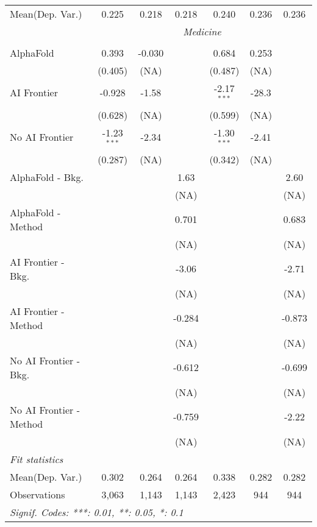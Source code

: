 \begin{tabular}{lcccccc}
Mean(Dep. Var.) & 0.225 & 0.218 & 0.218 & 0.240 & 0.236 & 0.236 \\
 & \multicolumn{6}{c}{\textit{Medicine}} \\ \\
   AlphaFold               & 0.393         & -0.030 &        & 0.684         & 0.253 &   \\   
                           & (0.405)       & (NA)   &        & (0.487)       & (NA)  &   \\   
   AI Frontier             & -0.928        & -1.58  &        & -2.17$^{***}$ & -28.3 &   \\   
                           & (0.628)       & (NA)   &        & (0.599)       & (NA)  &   \\   
   No AI Frontier          & -1.23$^{***}$ & -2.34  &        & -1.30$^{***}$ & -2.41 &   \\   
                           & (0.287)       & (NA)   &        & (0.342)       & (NA)  &   \\   
   AlphaFold - Bkg.        &               &        & 1.63   &               &       & 2.60\\   
                           &               &        & (NA)   &               &       & (NA)\\   
   AlphaFold - Method      &               &        & 0.701  &               &       & 0.683\\   
                           &               &        & (NA)   &               &       & (NA)\\   
   AI Frontier - Bkg.      &               &        & -3.06  &               &       & -2.71\\   
                           &               &        & (NA)   &               &       & (NA)\\   
   AI Frontier - Method    &               &        & -0.284 &               &       & -0.873\\   
                           &               &        & (NA)   &               &       & (NA)\\   
   No AI Frontier - Bkg.   &               &        & -0.612 &               &       & -0.699\\   
                           &               &        & (NA)   &               &       & (NA)\\   
   No AI Frontier - Method &               &        & -0.759 &               &       & -2.22\\   
                           &               &        & (NA)   &               &       & (NA)\\   
   \midrule
   \emph{Fit statistics}\\
Mean(Dep. Var.) & 0.302 & 0.264 & 0.264 & 0.338 & 0.282 & 0.282 \\
   Observations            & 3,063         & 1,143  & 1,143  & 2,423         & 944   & 944\\  
   \midrule \midrule
   \multicolumn{7}{l}{\emph{Signif. Codes: ***: 0.01, **: 0.05, *: 0.1}}\\
\end{tabular}
\par\endgroup
